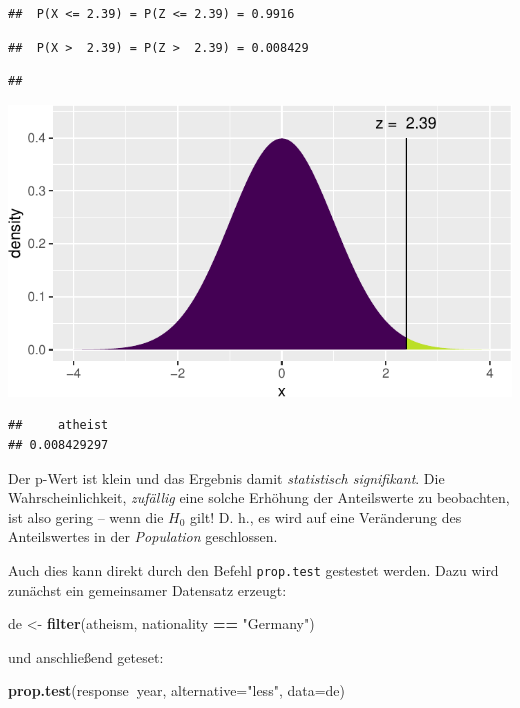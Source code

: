 \documentclass[12pt,ngerman,paper=a4,pagesize,DIV=13]{scrreprt}
\newenvironment{Shaded}{\begin{snugshade}}{\end{snugshade}}
\newcommand{\DataTypeTok}[1]{\textcolor[rgb]{0.13,0.29,0.53}{#1}}
\newcommand{\KeywordTok}[1]{\textcolor[rgb]{0.13,0.29,0.53}{\textbf{#1}}}
\newcommand{\NormalTok}[1]{#1}
\newcommand{\OperatorTok}[1]{\textcolor[rgb]{0.81,0.36,0.00}{\textbf{#1}}}
\newcommand{\StringTok}[1]{\textcolor[rgb]{0.31,0.60,0.02}{#1}}
\begin{document}
\begin{verbatim}
##  P(X <= 2.39) = P(Z <= 2.39) = 0.9916
\end{verbatim}

\begin{verbatim}
##  P(X >  2.39) = P(Z >  2.39) = 0.008429
\end{verbatim}

\begin{verbatim}
## 
\end{verbatim}

\includegraphics{DatenerhebungStatistik-Uebung_files/figure-latex/unnamed-chunk-110-1.pdf}

\begin{verbatim}
##     atheist 
## 0.008429297
\end{verbatim}

Der p-Wert ist klein und das Ergebnis damit \emph{statistisch
signifikant}. Die Wahrscheinlichkeit, \emph{zufällig} eine solche
Erhöhung der Anteilswerte zu beobachten, ist also gering -- wenn die
\(H_0\) gilt! D. h., es wird auf eine Veränderung des Anteilswertes in
der \emph{Population} geschlossen.

Auch dies kann direkt durch den Befehl \texttt{prop.test} gestestet
werden. Dazu wird zunächst ein gemeinsamer Datensatz erzeugt:

\begin{Shaded}
\begin{Highlighting}[]
\NormalTok{de <-}\StringTok{ }\KeywordTok{filter}\NormalTok{(atheism, nationality }\OperatorTok{==}\StringTok{ "Germany"}\NormalTok{)}
\end{Highlighting}
\end{Shaded}

und anschließend geteset:

\begin{Shaded}
\begin{Highlighting}[]
\KeywordTok{prop.test}\NormalTok{(response}\OperatorTok{~}\NormalTok{year, }\DataTypeTok{alternative=}\StringTok{"less"}\NormalTok{, }\DataTypeTok{data=}\NormalTok{de)}
\end{Highlighting}
\end{Shaded}
\end{document}
